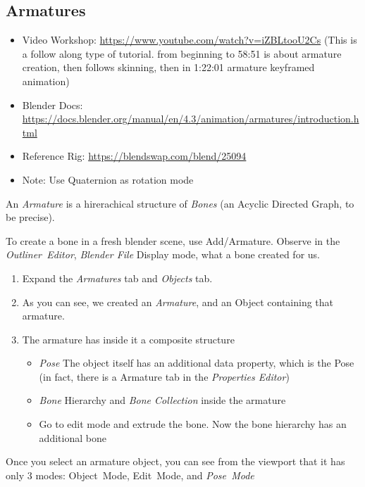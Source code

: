 \documentclass{article}
\begin{document}
\subsection{Armatures}
\begin{itemize}[noitemsep, topsep=0pt]
    \item Video Workshop: \href{https://www.youtube.com/watch?v=iZBLtooU2Cs}{https://www.youtube.com/watch?v=iZBLtooU2Cs} (This is a follow along type of tutorial. from beginning to 58:51 is about armature creation, then follows skinning, then in 1:22:01 armature keyframed animation)
    \item Blender Docs: \href{https://docs.blender.org/manual/en/4.3/animation/armatures/introduction.html}{https://docs.blender.org/manual/en/4.3/animation/armatures/introduction.html}
    \item Reference Rig: \href{https://blendswap.com/blend/25094}{https://blendswap.com/blend/25094}
    \item Note: Use Quaternion as rotation mode
\end{itemize}
An \textit{Armature} is a hirerachical structure of \textit{Bones} (an Acyclic Directed Graph, to be precise).\par
To create a bone in a fresh blender scene, use \mbox{Add/Armature}. Observe in the \mbox{\textit{Outliner Editor}}, \textit{Blender File} Display mode, what a bone created for us.
\begin{enumerate}[noitemsep, topsep=0pt]
    \item Expand the \textit{Armatures} tab and \textit{Objects} tab.
    \item As you can see, we created an \textit{Armature}, and an Object containing that armature.
    \item The armature has inside it a composite structure
    \begin{itemize}[noitemsep, topsep=0pt]
        \item \textit{Pose} The object itself has an additional data property, which is the Pose (in fact, there is a Armature tab in the \textit{Properties Editor})
        \item \textit{Bone} Hierarchy and \textit{Bone Collection} inside the armature
        \item Go to edit mode and extrude the bone. Now the bone hierarchy has an additional bone
    \end{itemize}
\end{enumerate}
Once you select an armature object, you can see from the viewport that it has only 3 modes: \mbox{Object Mode}, \mbox{Edit Mode}, and \mbox{\textit{Pose Mode}}
\end{document}

